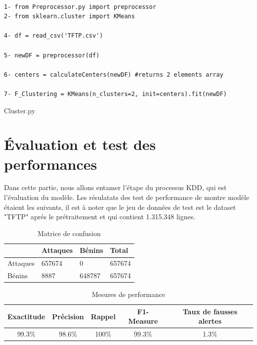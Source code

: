 \begin{algorithm}[H]
\begin{verbatim}

1- from Preprocessor.py import preprocessor 
2- from sklearn.cluster import KMeans

4- df = read_csv('TFTP.csv')

5- newDF = preprocessor(df)

6- centers = calculateCenters(newDF) #returns 2 elements array

7- F_Clustering = KMeans(n_clusters=2, init=centers).fit(newDF) 

\end{verbatim}
\caption{Cluster.py}
\end{algorithm}

\section{Évaluation et test des performances}
Dans cette partie, nous allons entamer l'étape du processus KDD, qui est l'évaluation du modèle. Les résulatats des test de performance de montre modèle étaient les suivants, il est à noter que le jeu de données de test est le dataset "TFTP" aprés le prétraitement et qui contient 1.315.348 lignes.

\begin{table}[h]
	\begin{center}
		\begin{tabular}{  | m{2.5cm} | m{2.5cm} | m{2.5cm} || m{2cm} | }
			\hline
			  & Attaques & Bénins & Total\\
			\hline
			Attaques & 657674 & 0 & 657674\\
			\hline
			Bénins & 8887 & 648787 & 657674\\
			\hline
		\end{tabular}
		\caption{Matrice de confusion}
	\end{center}
	\label{table:re}
\end{table}

\begin{table}[h]
	\begin{center}
		\begin{tabular}{  | c | c | c | c | c | }
			\hline
			\rowcolor[rgb]{0.85,0.85,0.85}
			 Exactitude & Précision & Rappel & F1-Measure & Taux de fausses alertes\\
			\hline
			99.3\% & 98.6\% & 100\% & 99.3\% & 1.3\%\\
			\hline
		\end{tabular}
		\caption{Mesures de performance }
	\end{center}
	\label{table:F_Clustering_Evaluation}
\end{table}

